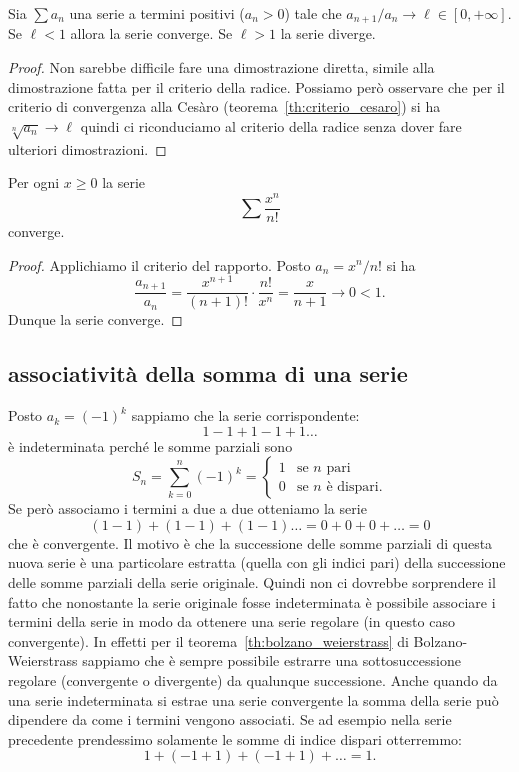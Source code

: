 \begin{theorem}
\mymark{***}
Sia $\sum a_n$ una serie a termini positivi
($a_n > 0$)
tale che $a_{n+1} / a_n \to \ell \in [0,+\infty]$.
Se $\ell <1$ allora la serie converge.
Se $\ell > 1$ la serie diverge.
\end{theorem}
%
\begin{proof}
\mymark{*}
Non sarebbe difficile fare una dimostrazione diretta, simile alla dimostrazione fatta per il criterio della radice.
Possiamo però osservare che
per il criterio di convergenza alla Cesàro (teorema~\ref{th:criterio_cesaro}) si ha $\sqrt[n]{a_n} \to \ell$
quindi ci riconduciamo al criterio della radice senza dover fare ulteriori dimostrazioni.
\end{proof}

\begin{example}
\mymark{***}
Per ogni $x\ge 0$ la serie
\[
  \sum \frac{x^n}{n!}
\]
converge.
\end{example}
%
\begin{proof}
Applichiamo il criterio del rapporto.
Posto $a_n = x^n / n!$ si ha
\[
\frac{a_{n+1}}{a_n}
= \frac{x^{n+1}}{(n+1)!}\cdot \frac{n!}{x^n}
= \frac{x}{n+1} \to 0 < 1.
\]
Dunque la serie converge.
\end{proof}

\subsection{associatività della somma di una serie}

\begin{example}
Posto $a_k = (-1)^k$ sappiamo che la serie corrispondente:
\[
  1 - 1 + 1 - 1 + 1 \dots
\]
è indeterminata perché le somme parziali sono
\[
  S_n = \sum_{k=0}^n (-1)^k
  = \begin{cases}
   1 & \text{se $n$ pari}\\
   0 & \text{se $n$ è dispari.}
  \end{cases}
\]
Se però associamo i termini a due a due otteniamo la serie
\[
  (1-1) + (1-1) + (1-1) \dots = 0 + 0 + 0 + \dots = 0
\]
che è convergente.
Il motivo è che la successione delle somme
parziali di questa nuova serie è una particolare estratta (quella
con gli indici pari) della successione delle somme parziali della
serie originale. Quindi non ci dovrebbe sorprendere il fatto che
nonostante la serie originale fosse indeterminata è possibile
associare i termini della serie in modo da ottenere una serie
regolare (in questo caso convergente).
In effetti per il teorema~\ref{th:bolzano_weierstrass} 
di Bolzano-Weierstrass sappiamo che
è sempre possibile estrarre una sottosuccessione regolare (convergente o divergente)
da qualunque successione.
Anche quando da una serie indeterminata si estrae una serie
convergente la somma della serie può dipendere da come i termini
vengono associati.
Se ad esempio nella serie precedente prendessimo
solamente le somme di indice dispari
otterremmo:
\[
  1 + (-1+1) + (-1+1) + \dots = 1.
\]
\end{example}

